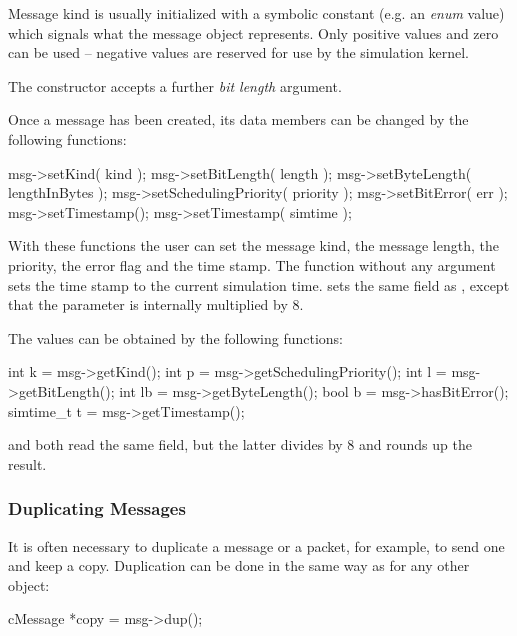 Message kind is usually initialized with a symbolic constant
(e.g. an \textit{enum} value) which signals what the message object
represents. Only positive values and zero can be used --
negative values are reserved for use by the simulation kernel.

The  constructor accepts a further \textit{bit length} argument.


Once a message has been created, its data members can be changed by the following functions:

\begin{cpp}
msg->setKind( kind );
msg->setBitLength( length );
msg->setByteLength( lengthInBytes );
msg->setSchedulingPriority( priority );
msg->setBitError( err );
msg->setTimestamp();
msg->setTimestamp( simtime );
\end{cpp}

With these functions the user can set the message
kind, the message length,
the priority, the error
flag and the time stamp. The  function without any argument
sets the time stamp to the current simulation time.
 sets the same field as ,
except that the parameter is internally multiplied by 8.

The values can be obtained by the following functions:

\begin{cpp}
int k       = msg->getKind();
int p       = msg->getSchedulingPriority();
int l       = msg->getBitLength();
int lb      = msg->getByteLength();
bool b      = msg->hasBitError();
simtime_t t = msg->getTimestamp();
\end{cpp}

 and  both read the same
field, but the latter divides by 8 and rounds up the result.


\subsubsection{Duplicating Messages}

It is often necessary to duplicate a message or a packet, for example,
to send one and keep a copy. Duplication can be done in the same way as
for any other {\opp} object:

\begin{cpp}
cMessage *copy = msg->dup();
\end{cpp}


